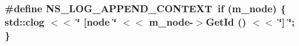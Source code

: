 \subsubsection[{\texorpdfstring{N\+S\+\_\+\+L\+O\+G\+\_\+\+A\+P\+P\+E\+N\+D\+\_\+\+C\+O\+N\+T\+E\+XT}{NS_LOG_APPEND_CONTEXT}}]{\setlength{\rightskip}{0pt plus 5cm}\#define N\+S\+\_\+\+L\+O\+G\+\_\+\+A\+P\+P\+E\+N\+D\+\_\+\+C\+O\+N\+T\+E\+XT~{\bf if} (m\+\_\+node) \{ std\+::clog $<$$<$ \char`\"{} \mbox{[}node \char`\"{} $<$$<$ m\+\_\+node-\/$>$Get\+Id () $<$$<$ \char`\"{}\mbox{]} \char`\"{}; \}}\hypertarget{tcp-l4-protocol_8cc_abe50035652d407c40bdaef78214c4955}{}\label{tcp-l4-protocol_8cc_abe50035652d407c40bdaef78214c4955}
